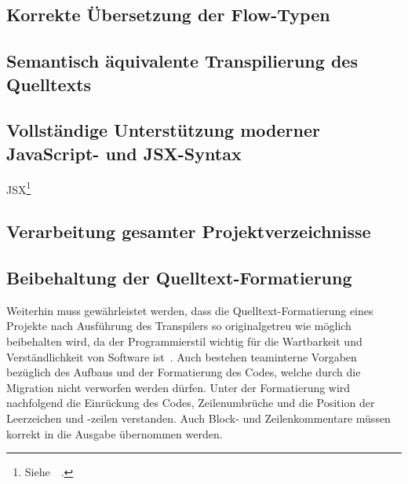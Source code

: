 \subsection{Korrekte Übersetzung der Flow-Typen}
\label{subsection:requirement:correct-translation}

\subsection{Semantisch äquivalente Transpilierung des Quelltexts}
\label{subsection:requirement:semantic-equivalence}

\subsection{Vollständige Unterstützung moderner JavaScript- und JSX-Syntax}
\label{subsection:requirement:modern-js-support}

JSX\footnote{Siehe~~\autocite{SOFTWARE:JSX}.}

\subsection{Verarbeitung gesamter Projektverzeichnisse}
\label{subsection:requirement:batch-processing}



\subsection{Beibehaltung der Quelltext-Formatierung}
\label{subsection:requirement:format}

Weiterhin muss gewährleistet werden, dass die Quelltext-Formatierung eines Projekte nach Ausführung des Transpilers so originalgetreu wie möglich beibehalten wird, da der Programmierstil wichtig für die Wartbarkeit und Verständlichkeit von Software ist~\autocite[146]{KERNIGHAN:1982}. Auch bestehen teaminterne Vorgaben bezüglich des Aufbaus und der Formatierung des Codes, welche durch die Migration nicht verworfen werden dürfen. Unter der Formatierung wird nachfolgend die Einrückung des Codes, Zeilenumbrüche und die Position der Leerzeichen und -zeilen verstanden. Auch Block- und Zeilenkommentare müssen korrekt in die Ausgabe übernommen werden.
